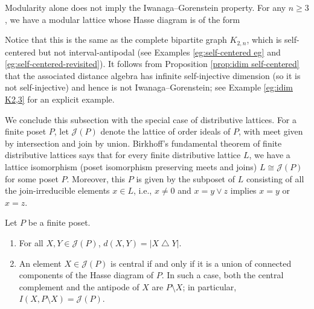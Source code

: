 \documentclass[a4paper,leqno]{amsart}
\begin{document}
\begin{rmk}\label{rmk:modular-non-IG}
Modularity alone does not imply the Iwanaga--Gorenstein property. 
For any $n\ge 3$, we have a modular lattice whose Hasse diagram is of the form
\begin{center}
\end{center}
Notice that this is the same as the complete bipartite graph $K_{2,n}$, which is self-centered but not interval-antipodal (see Examples \ref{eg:self-centered eg} and \ref{eg:self-centered-revisited}). 
It follows from Proposition \ref{prop:idim self-centered} that the associated distance algebra has infinite self-injective dimension (so it is not self-injective) and hence is not Iwanaga--Gorenstein; see Example \ref{eg:idim K2,3} for an explicit example.
\end{rmk}

We conclude this subsection with the special case of distributive lattices.  For a finite poset $P$, let $\mathcal J(P)$ denote the lattice of order ideals of $P$, with meet given by intersection and join by union.
Birkhoff's fundamental theorem of finite distributive lattices says that for every finite distributive lattice $L$, we have a lattice isomorphism (poset isomorphism preserving meets and joins) $L\cong \mathcal J(P)$ for some poset $P$.
Moreover, this $P$ is given by the subposet of $L$ consisting of all the join-irreducible elements $x\in L$, i.e., $x\neq 0$ and $x=y\vee z$ implies $x=y$ or $x=z$.

\begin{cor}\label{cor:J(P)-central}
Let $P$ be a finite poset.
\begin{enumerate}
    \item For all $X,Y\in \mathcal J(P)$, $d(X,Y)=|X\mathbin{\triangle}Y|$.
    \item An element $X\in \mathcal J(P)$ is central if and only if it is a union of connected components of the Hasse diagram of $P$.  In such a case, both the central complement and the antipode
of $X$ are $P\setminus X$; in particular, $I(X,P\setminus X)=\mathcal J(P)$.
\end{enumerate}
\end{cor}
\end{document}
